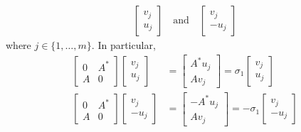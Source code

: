 \documentclass[12pt]{article}
\newenvironment{sol}[1][Solution]{\begin{trivlist}
		\item[\hskip \labelsep {\bfseries #1:}]}{\end{trivlist}}
\begin{document}
\begin{sol}
\begin{align*}
		\begin{bmatrix}
			v_j\\
			u_j
		\end{bmatrix}
		\quad
		\text{and}
		\quad 
		\begin{bmatrix}
			v_j\\
			-u_j
		\end{bmatrix}
	\end{align*}
	where $j\in\{1,\ldots,m\}$. In particular,
	\begin{align*}
		\begin{bmatrix}
			0 & A^*\\
			A & 0
		\end{bmatrix}
		\begin{bmatrix}
			v_j\\
			u_j
		\end{bmatrix}
		&=\begin{bmatrix}
			A^*u_j\\
			Av_j
		\end{bmatrix}
		=\sigma_1\begin{bmatrix}
			v_j\\
			u_j
		\end{bmatrix}\\
		\begin{bmatrix}
			0 & A^*\\
			A & 0
		\end{bmatrix}
		\begin{bmatrix}
			v_j\\
			-u_j
		\end{bmatrix}
		&=\begin{bmatrix}
			-A^*u_j\\
			Av_j
		\end{bmatrix}
		=-\sigma_1\begin{bmatrix}
			v_j\\
			-u_j
		\end{bmatrix}
	\end{align*}
\end{sol}
\end{document}
